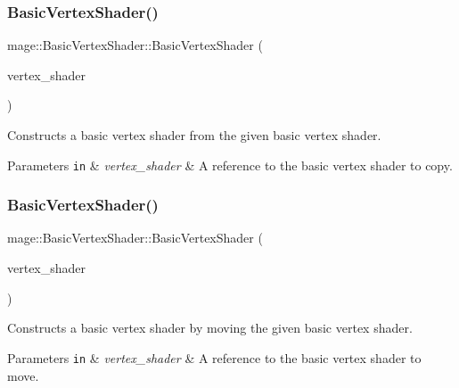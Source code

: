 \subsubsection{\texorpdfstring{Basic\+Vertex\+Shader()}{BasicVertexShader()}\hspace{0.1cm}{\footnotesize\ttfamily [5/6]}}
{\footnotesize\ttfamily mage\+::\+Basic\+Vertex\+Shader\+::\+Basic\+Vertex\+Shader (\begin{DoxyParamCaption}\item[{const \hyperlink{classmage_1_1_basic_vertex_shader}{Basic\+Vertex\+Shader} \&}]{vertex\+\_\+shader }\end{DoxyParamCaption})\hspace{0.3cm}{\ttfamily [delete]}}

Constructs a basic vertex shader from the given basic vertex shader.


\begin{DoxyParams}[1]{Parameters}
\mbox{\tt in}  & {\em vertex\+\_\+shader} & A reference to the basic vertex shader to copy. \\
\hline
\end{DoxyParams}
\hypertarget{classmage_1_1_basic_vertex_shader_a1c5f899e5dfaf81609e8e8fd73103ab2}{}\label{classmage_1_1_basic_vertex_shader_a1c5f899e5dfaf81609e8e8fd73103ab2} 
\subsubsection{\texorpdfstring{Basic\+Vertex\+Shader()}{BasicVertexShader()}\hspace{0.1cm}{\footnotesize\ttfamily [6/6]}}
{\footnotesize\ttfamily mage\+::\+Basic\+Vertex\+Shader\+::\+Basic\+Vertex\+Shader (\begin{DoxyParamCaption}\item[{\hyperlink{classmage_1_1_basic_vertex_shader}{Basic\+Vertex\+Shader} \&\&}]{vertex\+\_\+shader }\end{DoxyParamCaption})\hspace{0.3cm}{\ttfamily [default]}}

Constructs a basic vertex shader by moving the given basic vertex shader.


\begin{DoxyParams}[1]{Parameters}
\mbox{\tt in}  & {\em vertex\+\_\+shader} & A reference to the basic vertex shader to move. \\
\hline
\end{DoxyParams}
\hypertarget{classmage_1_1_basic_vertex_shader_ad155c4135f5517667020ec519a3597c9}{}\label{classmage_1_1_basic_vertex_shader_ad155c4135f5517667020ec519a3597c9} 

